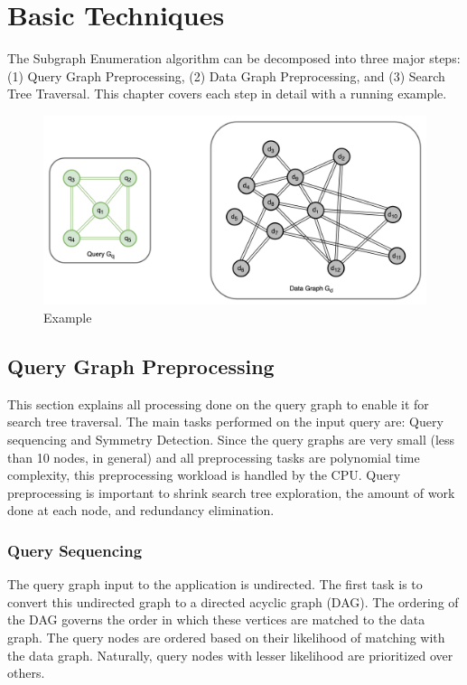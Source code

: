 \chapter{Basic Techniques}\label{chap:basic-theory}

The Subgraph Enumeration algorithm can be decomposed into three major steps: (1) Query Graph Preprocessing, (2) Data Graph Preprocessing, and (3) Search Tree Traversal. This chapter covers each step in detail with a running example.

\begin{figure}
    \includegraphics[width=\textwidth]{fig/LR/sgm-example1.png}
    \caption{Example}
    \label{fig:sgm-example}
\end{figure}
\section{Query Graph Preprocessing}\label{query-preprocessing}
This section explains all processing done on the query graph to enable it for search tree traversal.
The main tasks performed on the input query are: Query sequencing and Symmetry Detection.
Since the query graphs are very small (less than 10 nodes, in general) and all preprocessing tasks are polynomial time complexity, this preprocessing workload is handled by the CPU.
Query preprocessing is important to shrink search tree exploration, the amount of work done at each node, and redundancy elimination.

\subsection{Query Sequencing}
The query graph input to the application is undirected. The first task is to convert this undirected graph to a directed acyclic graph (DAG). The ordering of the DAG governs the order in which these vertices are matched to the data graph.
The query nodes are ordered based on their likelihood of matching with the data graph. Naturally, query nodes with lesser likelihood are prioritized over others.

